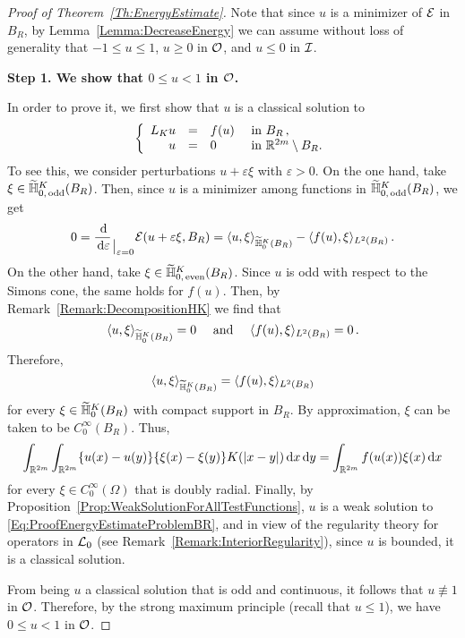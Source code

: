 \begin{proof}[Proof of Theorem~\ref{Th:EnergyEstimate}]

Note that since $u$ is a minimizer of $\mathcal{E}$ in $B_R$, by Lemma~\ref{Lemma:DecreaseEnergy} we can assume without loss of generality that $-1 \leq u \leq 1$, $u \geq 0$ in $\mathcal{O}$, and $u \leq 0$ in $\mathcal{I}$. 

\textbf{Step 1. We show that $0\leq u < 1$ in $\mathcal{O}$.} 

In order to prove it, we first show that $u$ is a classical solution to
\begin{equation}
\label{Eq:ProofEnergyEstimateProblemBR}
	\left\{\begin{array}{rcll}
	L_K  u &=& f(u) & \textrm{ in } B_R\,,\\
	u &=& 0 & \textrm{ in }\mathbb{R}^{2m} \setminus B_R.
	\end{array} \right.
\end{equation}
To see this, we consider perturbations $u +  \varepsilon \xi$ with $\varepsilon>0$. On the one hand, take $\xi \in \widetilde{\mathbb{H}}^K_{0, \,\mathrm{odd}}(B_R)$. Then, since $u$ is a minimizer among functions in $\widetilde{\mathbb{H}}^K_{0, \,\mathrm{odd}}(B_R)$, we get
$$
0 = \dfrac{\,\mathrm{d}}{\,\mathrm{d} \varepsilon}_{\mkern1.5mu\big\vert_{\scriptstyle \varepsilon = 0}} \mathcal{E}(u +  \varepsilon \xi, B_R) = \langle u,\xi \rangle_{\widetilde{\mathbb{H}}^K_0(B_R)} - \langle f(u),\xi \rangle_{L^2(B_R)}\,.
$$
On the other hand, take $\xi \in \widetilde{\mathbb{H}}^K_{0, \,\mathrm{even}}(B_R)$. Since $u$ is odd with respect to the Simons cone, the same holds for $f(u)$. Then, by Remark~\ref{Remark:DecompositionHK} we find that
$$
\langle u,\xi \rangle_{\widetilde{\mathbb{H}}^K_0(B_R)} = 0 \quad \textrm{ and } \quad  \langle f(u),\xi \rangle_{L^2(B_R)} = 0\,.
$$
Therefore, 
$$
\langle u,\xi \rangle_{\widetilde{\mathbb{H}}^K_0(B_R)} = \langle f(u),\xi \rangle_{L^2(B_R)}
$$
for every $\xi \in\widetilde{\mathbb{H}}^K_0(B_R)$ with compact support in  $B_R$. By approximation, $\xi$ can be taken to be $C^\infty_0(B_R)$. Thus,
$$
\int_{\mathbb{R}^{2m}}\int_{\mathbb{R}^{2m}} \{u(x)-u(y)\}\{\xi(x)-\xi(y)\} K(|x-y|) \,\mathrm{d} x \,\mathrm{d} y = \int_{\mathbb{R}^{2m}} f(u(x)) \xi(x) \,\mathrm{d} x
$$
for every $\xi \in C^\infty_0(\Omega)$ that is doubly radial. Finally, by Proposition~\ref{Prop:WeakSolutionForAllTestFunctions}, $u$ is a weak solution to \eqref{Eq:ProofEnergyEstimateProblemBR}, and in view of the regularity theory for operators in $\mathcal{L}_0$ (see Remark~\ref{Remark:InteriorRegularity}), since $u$ is bounded, it is a classical solution.

From being $u$ a classical solution that is odd and continuous, it follows that $u \not \equiv 1$ in $\mathcal{O}$. Therefore, by the strong maximum principle (recall that $u\leq 1$), we have $0\leq u < 1$ in $\mathcal{O}$. 


\end{proof}
